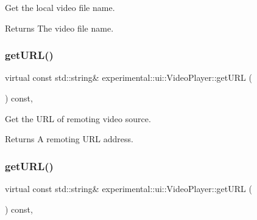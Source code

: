 Get the local video file name. 

\begin{DoxyReturn}{Returns}
The video file name. 
\end{DoxyReturn}
\mbox{\label{classexperimental_1_1ui_1_1VideoPlayer_a30f50a39a6fac899967613866ec274c1}} 
\subsubsection{\texorpdfstring{get\+U\+R\+L()}{getURL()}\hspace{0.1cm}{\footnotesize\ttfamily [1/2]}}
{\footnotesize\ttfamily virtual const std\+::string\& experimental\+::ui\+::\+Video\+Player\+::get\+U\+RL (\begin{DoxyParamCaption}{ }\end{DoxyParamCaption}) const\hspace{0.3cm}{\ttfamily [inline]}, {\ttfamily [virtual]}}



Get the U\+RL of remoting video source. 

\begin{DoxyReturn}{Returns}
A remoting U\+RL address. 
\end{DoxyReturn}
\mbox{\label{classexperimental_1_1ui_1_1VideoPlayer_a30f50a39a6fac899967613866ec274c1}} 
\subsubsection{\texorpdfstring{get\+U\+R\+L()}{getURL()}\hspace{0.1cm}{\footnotesize\ttfamily [2/2]}}
{\footnotesize\ttfamily virtual const std\+::string\& experimental\+::ui\+::\+Video\+Player\+::get\+U\+RL (\begin{DoxyParamCaption}{ }\end{DoxyParamCaption}) const\hspace{0.3cm}{\ttfamily [inline]}, {\ttfamily [virtual]}}



